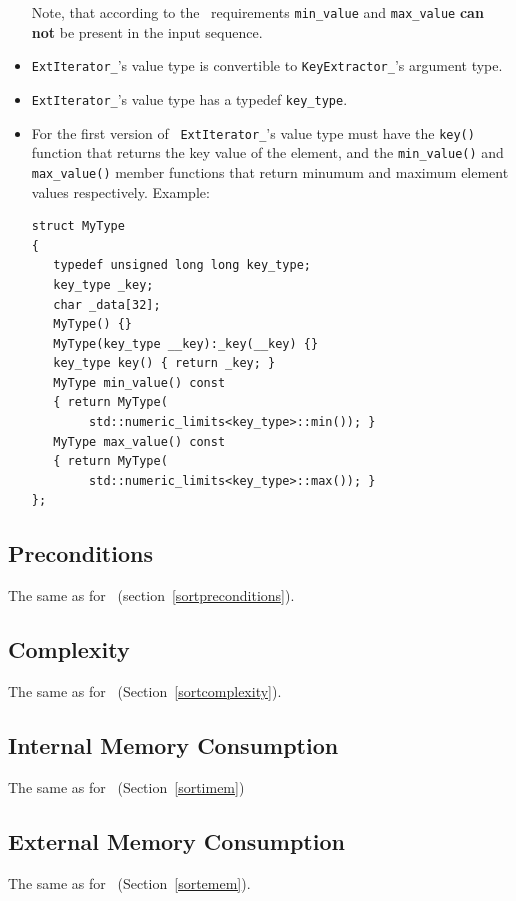 \documentclass[twoside]{book}
\begin{document}
\begin{itemize}
 Note, that according to the \xsort\ requirements \texttt{min\_value}
and \texttt{max\_value} {\bf can not} be present in the input
sequence.
\item \texttt{ExtIterator\_}'s value type is convertible to
\texttt{KeyExtractor\_}'s argument type.

\item  \texttt{ExtIterator\_}'s value type has a typedef
\texttt{key\_type}. 

\item For the first version of \xksort\ \texttt{ExtIterator\_}'s value
type  must have the \texttt{key()} function that returns the key value
of the element, and the \texttt{min\_value()} and \texttt{max\_value()}
member functions that return minumum and maximum element values
respectively. Example:
\begin{lstlisting}
struct MyType
{
   typedef unsigned long long key_type;
   key_type _key;
   char _data[32];
   MyType() {}
   MyType(key_type __key):_key(__key) {}
   key_type key() { return _key; }
   MyType min_value() const 
   { return MyType(
        std::numeric_limits<key_type>::min()); }
   MyType max_value() const 
   { return MyType(
        std::numeric_limits<key_type>::max()); }
};
\end{lstlisting}

\end{itemize}

\subsection*{Preconditions}
The same as for \xsort\ (section~\ref{sortpreconditions}).

\subsection*{Complexity}
The same as for \xsort\ (Section~\ref{sortcomplexity}).

\subsection*{Internal Memory Consumption}
The same as for \xsort\ (Section~\ref{sortimem})

\subsection*{External Memory Consumption}
The same as for \xsort\ (Section~\ref{sortemem}).
\end{document}
